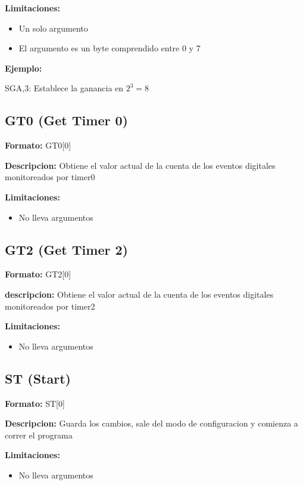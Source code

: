 \textbf{Limitaciones:}
\begin{itemize}
  \item Un solo argumento
  \item El argumento es un byte comprendido entre 0 y 7
\end{itemize}

\textbf{Ejemplo:}

SGA,3: Establece la ganancia en $2^{3} = 8$


\subsection{GT0 (Get Timer 0)}

\textbf{Formato:} GT0[0]

\textbf{Descripcion:}
Obtiene el valor actual de la cuenta de los eventos digitales monitoreados por timer0

\textbf{Limitaciones:}
\begin{itemize}
  \item No lleva argumentos


\end{itemize}\subsection{GT2 (Get Timer 2)}

\textbf{Formato:} GT2[0]

\textbf{descripcion:}
Obtiene el valor actual de la cuenta de los eventos digitales monitoreados por timer2

\textbf{Limitaciones:}
\begin{itemize}
  \item No lleva argumentos
\end{itemize}

\subsection{ST (Start)}

\textbf{Formato:} ST[0]

\textbf{Descripcion:}
Guarda los cambios, sale del modo de configuracion y comienza a correr el programa

\textbf{Limitaciones:}
\begin{itemize}
  \item No lleva argumentos
\end{itemize}


